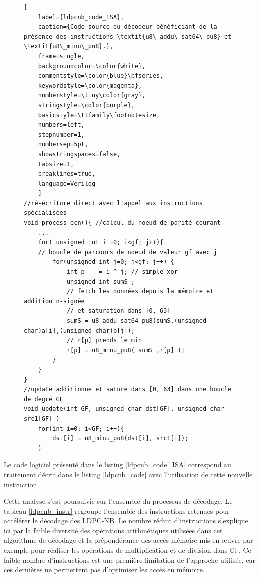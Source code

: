 \documentclass[../main.tex]{subfiles}
\begin{document}
\begin{figure}[!tb]
\begin{lstlisting}[
    label={ldpcnb_code_ISA},
    caption={Code source du décodeur bénéficiant de la présence des instructions \textit{u8\_addu\_sat64\_pu8} et \textit{u8\_minu\_pu8}.},
    frame=single,
    backgroundcolor=\color{white},  
    commentstyle=\color{blue}\bfseries,
    keywordstyle=\color{magenta},
    numberstyle=\tiny\color{gray},
    stringstyle=\color{purple},
    basicstyle=\ttfamily\footnotesize,
    numbers=left,
    stepnumber=1,
    numbersep=5pt,                 
    showstringspaces=false,
    tabsize=1,
    breaklines=true,
    language=Verilog
    ]
//ré-écriture direct avec l'appel aux instructions spécialisées 
void process_ecn(){ //calcul du noeud de parité courant 
    ...
    for( unsigned int i =0; i<gf; j++){
    // boucle de parcours de noeud de valeur gf avec j 
        for(unsigned int j=0; j<gf; j++) {
            int p    = i ^ j; // simple xor 
            unsigned int sumS ; 
            // fetch les données depuis la mémoire et addition n-signée
            // et saturation dans [0, 63] 
            sumS = u8_addu_sat64_pu8(sumS,(unsigned char)a[i],(unsigned char)b[j]);
            // r[p] prends le min
            r[p] = u8_minu_pu8( sumS ,r[p] );
        }
    }
}
//update additionne et sature dans [0, 63] dans une boucle de degré GF 
void update(int GF, unsigned char dst[GF], unsigned char src1[GF] )
    for(int i=0; i<GF; i++){
        dst[i] = u8_minu_pu8(dst[i], src1[i]);
    }
\end{lstlisting}
\end{figure}

Le code logiciel présenté dans le listing \ref{ldpcnb_code_ISA} correspond au traitement décrit dans le listing \ref{ldpcnb_code} avec l'utilisation de cette nouvelle instruction.

Cette analyse s'est poursuivie sur l'ensemble du processus de décodage. Le tableau \ref{ldpcnb_instr} regroupe l'ensemble des instructions retenues pour accélérer le décodage des LDPC-NB. Le nombre réduit d'instructions s'explique ici par la faible diversité des opérations arithmétiques utilisées dans cet algorithme de décodage et la prépondérance des accès mémoire mis en œuvre par exemple pour réaliser les opérations de multiplication et de division dans $\mathbb{GF}$. Ce faible nombre d'instructions est une première limitation de l'approche utilisée, car ces dernières ne permettent pas d'optimiser les accès en mémoire. 

%
\end{document}

